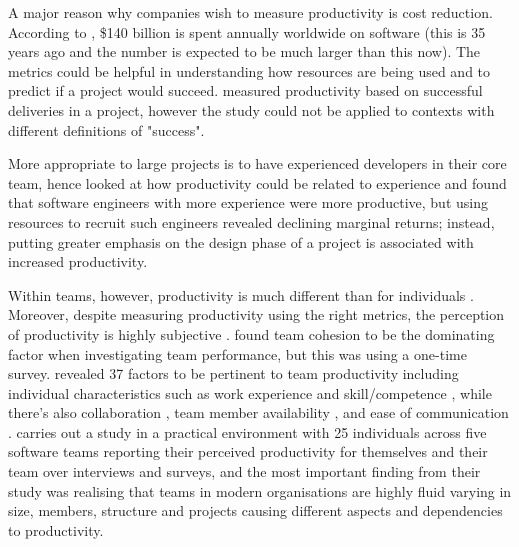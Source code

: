 \documentclass{mprop}
\begin{document}
A major reason why companies wish to measure productivity is cost reduction. According to \textcite{boehmImprovingSoftwareProductivity1987}, \$140 billion is spent annually worldwide on software (this is 35 years ago and the number is expected to be much larger than this now). The metrics could be helpful in understanding how resources are being used and to predict if a project would succeed. \textcite{mockusSuccessionMeasuringTransfer2009} measured productivity based on successful deliveries in a project, however the study could not be applied to contexts with different definitions of "success".

More appropriate to large projects is to have experienced developers in their core team, hence \textcite{gillProductivityImpactsSoftware1990} looked at how productivity could be related to experience and found that software engineers with more experience were more productive, but using resources to recruit such engineers revealed declining marginal returns; instead, putting greater emphasis on the design phase of a project is associated with increased productivity.

Within teams, however, productivity is much different than for individuals \cite{kimUnderstandingPersonalProductivity2019,markNeuroticsCanFocus2016}. Moreover, despite measuring productivity using the right metrics, the perception of productivity is highly subjective \cite{koWhyWeShould2019,meyerSoftwareDevelopersPerceptions2014}. \textcite{lakhanpalUnderstandingFactorsInfluencing1993} found team cohesion to be the dominating factor when investigating team performance, but this was using a one-time survey. \textcite{canedoFactorsAffectingSoftware2019} revealed 37 factors to be pertinent to team productivity including individual characteristics such as work experience \cite{deomeloInterpretativeCaseStudies2013} and skill/competence \cite{maxwellBenchmarkingSoftwareDevelopmentProductivity2000,oliveiraSoftwareProjectManagers2016}, while there's also collaboration \cite{clincySoftwareDevelopmentProductivity2003,stephanidisHCIInternational20152015}, team member availability \cite{deomeloInterpretativeCaseStudies2013,maxwellBenchmarkingSoftwareDevelopmentProductivity2000}, and ease of communication \cite{wagnerSystematicReviewProductivity2018,yilmazEffectiveSocialProductivity2016}. \textcite{ruvimovaExploratoryStudyProductivity2022} carries out a study in a practical environment with 25 individuals across five software teams reporting their perceived productivity for themselves and their team over interviews and surveys, and the most important finding from their study was realising that teams in modern organisations are highly fluid varying in size, members, structure and projects causing different aspects and dependencies to productivity.
\end{document}
